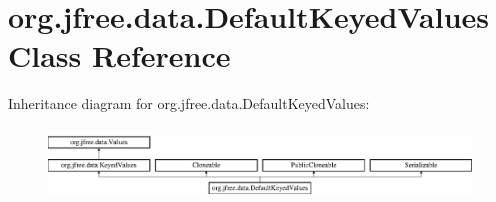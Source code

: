 \hypertarget{classorg_1_1jfree_1_1data_1_1_default_keyed_values}{}\section{org.\+jfree.\+data.\+Default\+Keyed\+Values Class Reference}
\label{classorg_1_1jfree_1_1data_1_1_default_keyed_values}
Inheritance diagram for org.\+jfree.\+data.\+Default\+Keyed\+Values\+:\begin{figure}[H]
\begin{center}
\leavevmode
\includegraphics[height=1.944444cm]{classorg_1_1jfree_1_1data_1_1_default_keyed_values}
\end{center}
\end{figure}
